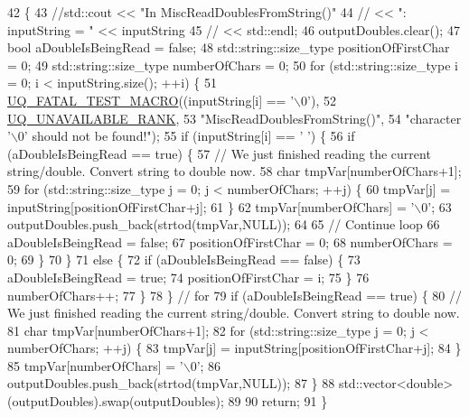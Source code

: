 \begin{DoxyCode}
42 \{
43   \textcolor{comment}{//std::cout << "In MiscReadDoublesFromString()"}
44   \textcolor{comment}{//          << ": inputString = " << inputString}
45   \textcolor{comment}{//          << std::endl;}
46   outputDoubles.clear();
47   \textcolor{keywordtype}{bool} aDoubleIsBeingRead = \textcolor{keyword}{false};
48   std::string::size\_type positionOfFirstChar = 0;
49   std::string::size\_type numberOfChars = 0;
50   \textcolor{keywordflow}{for} (std::string::size\_type i = 0; i < inputString.size(); ++i) \{
51     \hyperlink{_defines_8h_a56d63d18d0a6d45757de47fcc06f574d}{UQ\_FATAL\_TEST\_MACRO}((inputString[i] == \textcolor{charliteral}{'\(\backslash\)0'}),
52                         \hyperlink{namespace_q_u_e_s_o_a7d4679800a430ae8e473c1c7bc0bfb21}{UQ\_UNAVAILABLE\_RANK},
53                         \textcolor{stringliteral}{"MiscReadDoublesFromString()"},
54                         \textcolor{stringliteral}{"character '\(\backslash\)0' should not be found!"});
55     \textcolor{keywordflow}{if} (inputString[i] == \textcolor{charliteral}{' '}) \{
56       \textcolor{keywordflow}{if} (aDoubleIsBeingRead == \textcolor{keyword}{true}) \{
57         \textcolor{comment}{// We just finished reading the current string/double. Convert string to double now.}
58         \textcolor{keywordtype}{char} tmpVar[numberOfChars+1];
59         \textcolor{keywordflow}{for} (std::string::size\_type j = 0; j < numberOfChars; ++j) \{
60           tmpVar[j] = inputString[positionOfFirstChar+j];
61         \}
62         tmpVar[numberOfChars] = \textcolor{charliteral}{'\(\backslash\)0'};
63         outputDoubles.push\_back(strtod(tmpVar,NULL));
64 
65         \textcolor{comment}{// Continue loop}
66         aDoubleIsBeingRead = \textcolor{keyword}{false};
67         positionOfFirstChar = 0;
68         numberOfChars = 0;
69       \}
70     \}
71     \textcolor{keywordflow}{else} \{
72       \textcolor{keywordflow}{if} (aDoubleIsBeingRead == \textcolor{keyword}{false}) \{
73         aDoubleIsBeingRead = \textcolor{keyword}{true};
74         positionOfFirstChar = i;
75       \}
76       numberOfChars++;
77     \}
78   \} \textcolor{comment}{// for}
79   \textcolor{keywordflow}{if} (aDoubleIsBeingRead == \textcolor{keyword}{true}) \{
80     \textcolor{comment}{// We just finished reading the current string/double. Convert string to double now.}
81     \textcolor{keywordtype}{char} tmpVar[numberOfChars+1];
82     \textcolor{keywordflow}{for} (std::string::size\_type j = 0; j < numberOfChars; ++j) \{
83       tmpVar[j] = inputString[positionOfFirstChar+j];
84     \}
85     tmpVar[numberOfChars] = \textcolor{charliteral}{'\(\backslash\)0'};
86     outputDoubles.push\_back(strtod(tmpVar,NULL));
87   \}
88   std::vector<double>(outputDoubles).swap(outputDoubles);
89 
90   \textcolor{keywordflow}{return};
91 \}
\end{DoxyCode}
